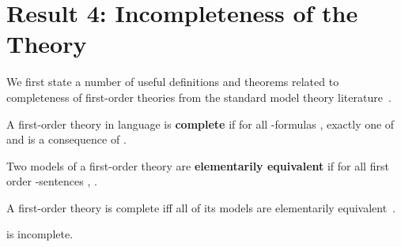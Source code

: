 \section{Result 4: Incompleteness of the Theory }
\label{sec:incompleteness}

We first state a number of useful definitions and theorems related to
completeness of first-order theories from the standard model theory
literature~\cite{HodgesModelTheory}.

\begin{Definition}
A first-order theory  in language  is \textbf{complete} if for
all -formulas , exactly one of  and  is a
consequence of .
\end{Definition}

\begin{Definition}
Two models  of a first-order theory are \textbf{elementarily
  equivalent} if for all first order -sentences , .
\end{Definition}

\begin{Theorem}
\label{thm:completeIffEquivalent}
A first-order theory  is complete iff all of its models
are elementarily equivalent~\cite{HodgesModelTheory}.
\end{Theorem}


\begin{Theorem}
 is incomplete.
\end{Theorem}

